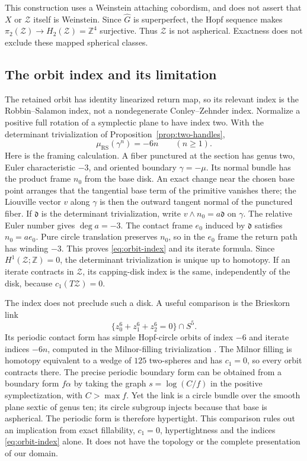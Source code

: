 \documentclass[11pt]{amsart}
\theoremstyle{definition}
\theoremstyle{remark}
\newcommand{\Z}{\mathbb Z}
\begin{document}
This construction uses a Weinstein attaching cobordism, and does not
assert that $X$ or $\mathcal Z$ itself is Weinstein. Since
$\widehat G$ is superperfect, the Hopf sequence makes
$\pi_2(\mathcal Z)\to H_2(\mathcal Z)=\Z^4$ surjective.
Thus $\mathcal Z$ is not aspherical. Exactness does not exclude
these mapped spherical classes.

\subsection{The orbit index and its limitation}
The retained orbit has identity linearized return map, so its relevant
index is the Robbin--Salamon index, not a nondegenerate
Conley--Zehnder index. Normalize a positive full rotation of a
symplectic plane to have index two. With the determinant trivialization
of Proposition~\ref{prop:two-handles},
\begin{equation}\label{eq:orbit-index}
                         \mu_{\mathrm{RS}}(\gamma^n)=-6n
                         \qquad(n\ge1).
\end{equation}
Here is the framing calculation. A fiber punctured at the section has
genus two, Euler characteristic $-3$, and oriented boundary
$\gamma=-\mu$. Its normal bundle has the product frame $n_0$ from
the base disk. An exact change near the chosen base point arranges that
the tangential base term of the primitive vanishes there; the Liouville
vector $v$ along $\gamma$ is then the outward tangent normal of the
punctured fiber. If $\mathfrak d$ is the determinant trivialization, write
$v\wedge n_0=a\mathfrak d$ on $\gamma$. The relative Euler number gives
$\deg a=-3$. The contact frame $e_0$ induced by $\mathfrak d$ satisfies
$n_0=ae_0$. Pure circle translation preserves $n_0$, so in the
$e_0$ frame the return path has winding $-3$. This proves
\eqref{eq:orbit-index} and its iterate formula. Since
$H^1(\mathcal Z;\Z)=0$, the determinant trivialization is unique
up to homotopy. If an iterate contracts in $\mathcal Z$, its
capping-disk index is the same, independently of the disk, because
$c_1(T\mathcal Z)=0$.

The index does not preclude such a disk. A useful comparison is the
Brieskorn link
\[
 \{z_0^6+z_1^6+z_2^6=0\}\cap S^5.
\]
Its periodic contact form has simple Hopf-circle orbits of index $-6$
and iterate indices $-6n$, computed in the Milnor-filling trivialization
\cite[Sections 2--3 and 5.3, Proposition 5.9]{KvK16}. The Milnor
filling is homotopy equivalent to a wedge of $125$ two-spheres and has
$c_1=0$, so every orbit contracts there. The precise periodic boundary
form can be obtained from a boundary form $f\alpha$ by taking the
graph $s=\log(C/f)$ in the positive symplectization, with $C>\max f$.
Yet the link is a circle bundle over the smooth plane sextic of genus
ten; its circle subgroup injects because that base is aspherical.
The periodic form is therefore hypertight. This comparison rules out
an implication from exact fillability, $c_1=0$, hypertightness and the
indices \eqref{eq:orbit-index} alone. It does not have the topology or
the complete presentation of our domain.
\end{document}
